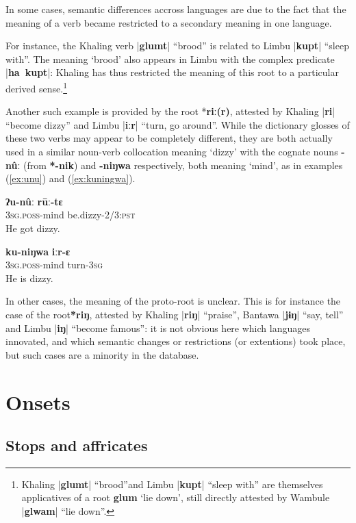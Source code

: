 \documentclass[oldfontcommands,oneside,a4paper,11pt]{article}
\newcommand{\ipa}[1]{\textbf{{\phon\mbox{#1}}}} %
\newcommand{\dhatu}[2]{|\ipa{#1}| ``#2''}
\newcommand{\dhat}[1]{|\ipa{#1}|}
\begin{document}
In some cases, semantic differences accross languages are due to the fact that the meaning of a verb became restricted to a secondary meaning in one language. 

For instance, the Khaling verb \dhatu{glumt}{brood} is related to Limbu \dhatu{kupt}{sleep with}. The meaning `brood' also appears in Limbu with the complex predicate \dhat{ha kupt}: Khaling has thus restricted the meaning of this root to a particular derived sense.\footnote{Khaling \dhatu{glumt}{brood}and Limbu  \dhatu{kupt}{sleep with} are themselves applicatives of a root \ipa{glum} `lie down', still directly attested by Wambule  \dhatu{glwam}{lie down}.  }

Another such example is provided by the root *\ipa{riː(r)}, attested by Khaling \dhatu{ri}{become dizzy} and Limbu \dhatu{iːr}{turn, go around}. While the dictionary glosses of these two verbs may appear to be completely different, they are both actually used in a similar noun-verb collocation meaning `dizzy' with the cognate nouns \ipa{-nûː} (from \ipa{*-nik}) and \ipa{-niŋwa} respectively, both meaning `mind', as in examples (\ref{ex:unu}) and (\ref{ex:kuningwa}).

\begin{exe}
\ex \label{ex:unu}
\gll \ipa{ʔu-nûː} \ipa{rūː-tɛ} \\
\textsc{3sg.poss}-mind be.dizzy-\textsc{2/3:pst} \\
\glt He got dizzy.
\end{exe}


\begin{exe}
\ex \label{ex:kuningwa}
\gll \ipa{ku-niŋwa} \ipa{iːr-ɛ} \\
\textsc{3sg.poss}-mind turn-\textsc{3sg} \\
\glt He is dizzy.
\end{exe}

In other cases, the meaning of the proto-root is unclear. This is for instance the case of the root\ipa{*riŋ}, attested by Khaling \dhatu{riŋ}{praise}, Bantawa \dhatu{jɨŋ}{say, tell} and Limbu \dhatu{iŋ}{become famous}: it is not obvious here which languages innovated, and which semantic changes or restrictions (or extentions) took place, but such cases are a minority in the database.

\section{Onsets} \label{sec:onsets}

\subsection{Stops and affricates} \label{sec:stops}
\end{document}
